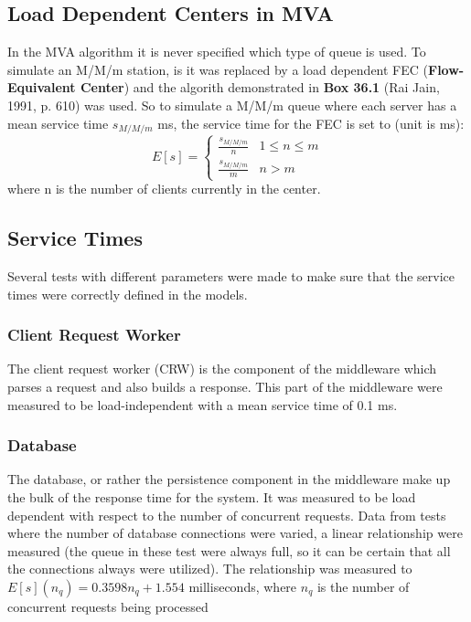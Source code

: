 \documentclass[a4paper, 11pt]{article}
\begin{document}
	\subsection{Load Dependent Centers in MVA}
		In the MVA algorithm it is never specified which type of queue is used. To simulate an M/M/m station, is it was replaced by a load dependent FEC (\textbf{Flow-Equivalent Center}) and the algorith demonstrated in \textbf{Box 36.1} (Rai Jain, 1991, p. 610) was used. So to simulate a M/M/m queue where each server has a mean service time $s_{M/M/m}$ ms, the service time for the FEC is set to (unit is ms):
		\[
		E[s] =
			\begin{cases}
				\frac{s_{M/M/m}}{n} 		& 1 \leq n \leq m \\
				\frac{s_{M/M/m}}{m} 		& n > m
			\end{cases}
		\]
		where n is the number of clients currently in the center.

	\subsection{Service Times}
		Several tests with different parameters were made to make sure that the service times were correctly defined in the models. 

	\subsubsection{Client Request Worker}
		The client request worker (CRW) is the component of the middleware which parses a request and also builds a response. This part of the middleware were measured to be load-independent with a mean service time of 0.1 ms.

	\subsubsection{Database}\label{sec:database-service-time}
		The database, or rather the persistence component in the middleware make up the bulk of the response time for the system. It was measured to be load dependent with respect to the number of concurrent requests. Data from tests where the number of database connections were varied, a linear relationship were measured (the queue in these test were always full, so it can be certain that all the connections always were utilized). The relationship was measured to $E[s](n_q) = 0.3598n_q + 1.554$ milliseconds, where $n_q$ is the number of concurrent requests being processed
\end{document}
